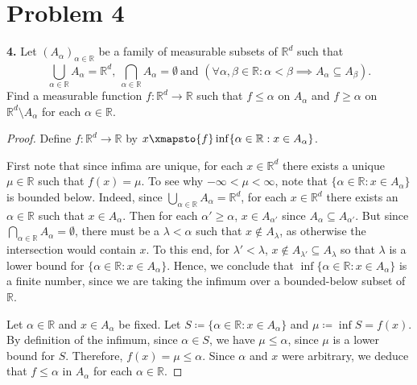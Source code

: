 \section*{Problem 4}
\noindent \textbf{4.} Let \( (A_\alpha)_{\alpha \in \mathbb{R}}  \) be a family of measurable subsets of \( \mathbb{R}^{d}  \) such that \[\bigcup_{\alpha \in \mathbb{R}}^{} A_\alpha = \mathbb{R}^{d} , \ \bigcap_{\alpha \in \mathbb{R}}^{} A_{\alpha} = \emptyset \ \mbox{and } (\forall \alpha, \beta \in \mathbb{R} : \alpha < \beta \implies A_\alpha \subseteq A_\beta).\] Find a measurable function \( f : \mathbb{R}^{d} \to \mathbb{R} \) such that \( f \leq \alpha \) on \( A_\alpha \) and \( f \geq \alpha \) on \( \mathbb{R}^{d} \setminus A_\alpha \) for each \( \alpha \in \mathbb{R} \).
\begin{proof}
	Define \( f : \mathbb{R}^{d} \to \mathbb{R} \) by \( x \xmapsto{f} \inf \{ \alpha \in \mathbb{R} : x \in A_\alpha \}  \).

	First note that since infima are unique, for each \( x \in \mathbb{R}^{d}  \) there exists a unique \( \mu \in \mathbb{R} \) such that \( f(x) = \mu \). To see why \( -\infty < \mu < \infty \), note that \( \{ \alpha \in \mathbb{R} : x \in A_\alpha \}  \) is bounded below. Indeed, since \( \bigcup_{\alpha \in \mathbb{R}}^{} A_\alpha = \mathbb{R}^{d} \), for each \( x \in \mathbb{R}^{d}  \) there exists an \( \alpha \in \mathbb{R} \) such that \( x \in A_{\alpha}  \). Then for each \( \alpha' \geq \alpha \), \( x \in A_{\alpha'}  \) since \( A_\alpha \subseteq A_{\alpha'}  \). But since \( \bigcap_{\alpha \in \mathbb{R}}^{} A_\alpha = \emptyset \), there must be a \( \lambda < \alpha \) such that \( x \notin A_{\lambda}  \), as otherwise the intersection would contain \( x \). To this end, for \( \lambda' < \lambda \), \( x \notin A_{\lambda'} \subseteq A_\lambda  \) so that \( \lambda \) is a lower bound for \( \{ \alpha \in \mathbb{R} : x \in A_\alpha \}  \). Hence, we conclude that \( \inf \{ \alpha \in \mathbb{R} : x \in A_\alpha \}  \) is a finite number, since we are taking the infimum over a bounded-below subset of \( \mathbb{R} \). 

	Let \( \alpha \in \mathbb{R} \) and \( x \in A_\alpha \) be fixed. Let \( S \coloneqq \{ \alpha \in \mathbb{R} : x \in A_\alpha \}  \) and \( \mu \coloneqq \inf S = f(x). \) By definition of the infimum, since \( \alpha \in S \), we have \( \mu \leq \alpha \), since \( \mu \) is a lower bound for \( S \). Therefore, \( f(x) = \mu \leq \alpha \). Since \( \alpha \) and \( x \) were arbitrary, we deduce that \( f \leq \alpha \) in \( A_\alpha \) for each \( \alpha \in \mathbb{R} \).


\end{proof}
